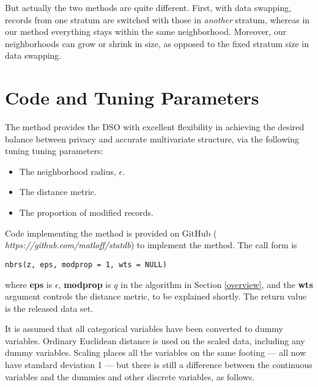 \documentclass[11pt]{article}
\begin{document}
But actually the two methods are quite different.  First, with data
swapping, records from one stratum are switched with those in {\it
another} stratum, whereas in our method everything stays within the same
neighborhood.  
Moreover, 
our neighborhoods can grow or shrink in size, as opposed to
the fixed stratum size in data swapping.  

\section{Code and Tuning Parameters}

The method provides the DSO with excellent flexibility in achieving the
desired balance between privacy and accurate multivariate structure, via
the following tuning tuning parameters:

\begin{itemize}

\item The neighborhood radius, $\epsilon$.

\item The distance metric.

\item The proportion of modified records.  

\end{itemize}

Code implementing the method is provided on GitHub ({\it
https://github.com/matloff/statdb}) to implement the method.  The call
form is

\begin{lstlisting}
nbrs(z, eps, modprop = 1, wts = NULL) 
\end{lstlisting}

where {\bf eps} is $\epsilon$, {\bf modprop} is $q$ in the algorithm
in Section \ref{overview}, and the {\bf wts} argument controls the
distance metric, to be explained shortly.  The return value is the
released data set.

It is assumed that all categorical variables have been converted to
dummy variables.  Ordinary Euclidean distance is used on the scaled
data, including any dummy variables.  Scaling places all the variables
on the same footing --- all now have standard deviation 1 --- but there
is still a difference between the continuous variables and the dummies
and other discrete variables, as follows.
\end{document}
